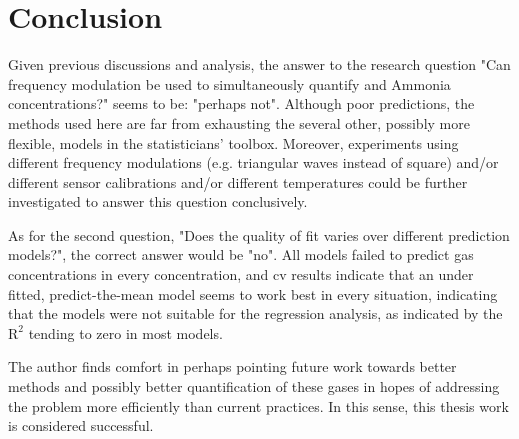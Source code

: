 
\chapter{Conclusion}
\label{cha:conclusion}

Given previous discussions and analysis, the answer to the research question "Can frequency modulation be used to simultaneously quantify \nox and Ammonia concentrations?" seems to be: "perhaps not". Although poor predictions, the methods used here are far from exhausting the several other, possibly more flexible, models in the statisticians' toolbox. Moreover, experiments using different frequency modulations (e.g. triangular waves instead of square) and/or different sensor calibrations and/or different temperatures could be further investigated to answer this question conclusively.

As for the second question, "Does the quality of fit varies over different prediction models?", the correct answer would be "no". All models failed to predict gas concentrations in every concentration, and \acrshort{cv} results indicate that an under fitted, predict-the-mean model seems to work best in every situation, indicating that the models were not suitable for the regression analysis, as indicated by the $\text{R}^2$ tending to zero in most models.

The author finds comfort in perhaps pointing future work towards better methods and possibly better quantification of these gases in hopes of addressing the problem more efficiently than current practices. In this sense, this thesis work is considered successful.

